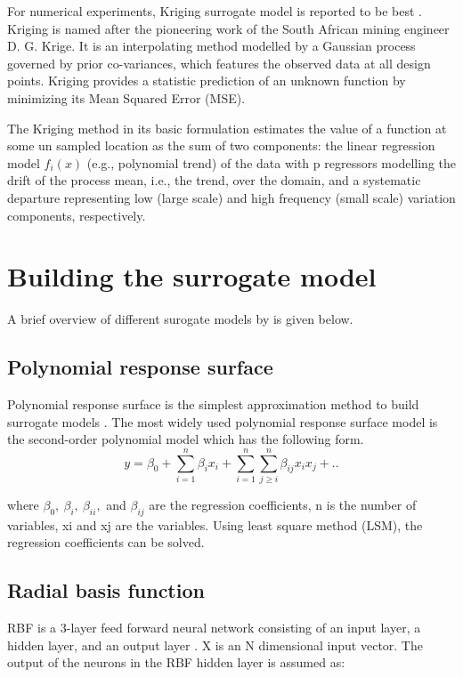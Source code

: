 For numerical experiments, Kriging surrogate model is reported to be best . Kriging is named after the pioneering work of the South African mining engineer D. G. Krige. It is an interpolating method modelled by a Gaussian process governed by prior co-variances, which features the observed data at all design points. Kriging provides a statistic prediction of an unknown function by minimizing its Mean Squared Error (MSE).

The Kriging method in its basic formulation estimates the value of a function at some un sampled location as the sum of two components: the linear regression model $ f_i (x) $ (e.g., polynomial trend) of the data with p regressors modelling the drift of the process mean, i.e., the trend, over the domain, and a systematic departure representing low (large scale) and high frequency (small scale) variation components, respectively.

\section{Building the surrogate model}
A brief overview of different surogate models by \cite{luo2014comparison} is given below.
\subsection{Polynomial response surface}
Polynomial response surface is the simplest approximation method to build surrogate models \cite{forrester2009recent}. The most widely used polynomial response surface model is the second-order polynomial model which has the following form.
\begin{equation}
y = \beta _{0} + \sum_{i=1}^{n} \beta _{i} x_{i} + \sum_{i=1}^{n} \sum_{j \ge i}^{n} \beta _{ij} x_{i} x_{j} + ..
\end{equation}

where $ \beta _{0},\ \beta_{i},\ \beta _{ii},$ and $ \beta _{ij} $ are the regression coefficients, n is the number of variables, xi and xj are the variables. Using least square method (LSM), the regression coefficients can be solved.

\subsection{Radial basis function}
RBF is a 3-layer feed forward neural network consisting of an input layer, a hidden layer, and an output layer \cite{shen2011forecasting}. X is an N dimensional input vector. The output of the neurons in the RBF hidden layer is assumed as:

